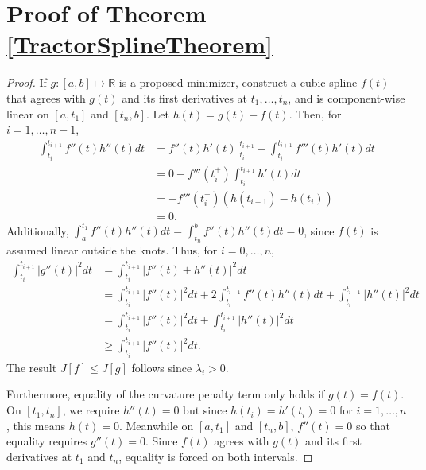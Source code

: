 \section{Proof of Theorem \ref{TractorSplineTheorem}}\label{AppendixTractorSplineProof}

\begin{proof}
If $g:[a,b]\mapsto \mathbb{R}$ is a proposed minimizer, construct a cubic spline $f(t)$ that agrees with $g(t)$ and its first derivatives at $t_1,\ldots,t_n$, and is component-wise linear on $[a, t_1]$ and $[t_n, b]$. Let $h(t) = g(t)-f(t)$. Then, for $i = 1,\dots ,n-1$, 
\begin{align*}
\int_{t_i}^{t_{i+1}}f''(t)h''(t)dt &=f''(t)h'(t) \bigg\rvert_{t_i}^{t_{i+1}}-\int_{t_i}^{t_{i+1}}f'''(t)h'(t)dt \\
&= 0-f'''\left(t_i^+\right)\int_{t_i}^{t_{i+1}}h'(t)dt \\
&= -f'''\left(t_i^+\right)\left( h(t_{i+1}) -h(t_i) \right)\\
&=0.
\end{align*}
Additionally, $\int_{a}^{t_1}f''(t)h''(t)dt=\int_{t_n}^{b}f''(t)h''(t)dt=0$, since $f(t)$ is assumed linear outside the knots. Thus, for $i=0,\ldots,n$, 
\begin{align*}
\int_{t_i}^{t_{i+1}}\lvert g''(t) \rvert^2dt &= \int_{t_i}^{t_{i+1}}\lvert f''(t)+h''(t)\rvert^2 dt\\
&= \int_{t_i}^{t_{i+1}}\lvert f''(t)\rvert^2dt+2\int_{t_i}^{t_{i+1}}f''(t)h''(t)dt+\int_{t_i}^{t_{i+1}}\lvert h''(t)\rvert^2dt\\
&=\int_{t_i}^{t_{i+1}}\lvert f''(t)\rvert^2dt+\int_{t_i}^{t_{i+1}}\lvert h''(t)\rvert^2dt\\
&\geq \int_{t_i}^{t_{i+1}}\lvert f''(t)\rvert^2dt.
\end{align*}
The result $J[f]\leq J[g]$ follows since $\lambda_i>0$. 

Furthermore, equality of the curvature penalty term only holds if $g(t) = f(t)$. On $[t_1, t_n]$, we require $h''(t) = 0$ but since $h(t_i) = h'(t_i) = 0$ for $i = 1, \ldots , n$, this means $h(t) = 0$. Meanwhile on $[a, t_1]$ and $[t_n, b]$, $f''(t) = 0$ so that equality requires $g''(t)=0$. Since $f(t)$ agrees with $g(t)$ and its first derivatives at $t_1$ and $t_n$, equality is forced on both intervals.
\end{proof}

